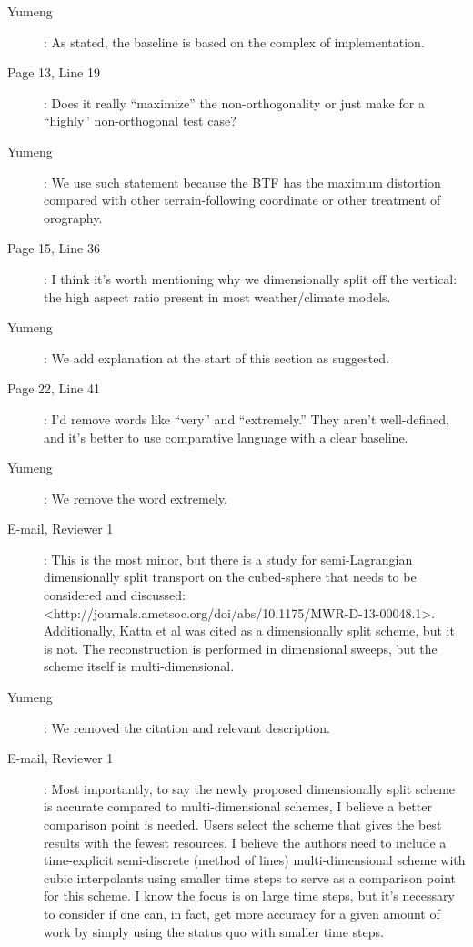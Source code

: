 \documentclass[12pt,a4paper]{article}
\begin{document}
\begin{description}
\item [Yumeng]: As stated, the baseline is based on the complex of implementation. 

\item [Page 13, Line 19]: Does it really ``maximize'' the non-orthogonality or just make for a ``highly'' non-orthogonal test case?

\item [Yumeng]: We use such statement because the BTF has the maximum distortion compared with other terrain-following coordinate or other treatment of orography.

\item [Page 15, Line 36]: I think it's worth mentioning why we dimensionally split off the vertical: the high aspect ratio present in most weather/climate models.

\item [Yumeng]: We add explanation at the start of this section as suggested.

\item [Page 22, Line 41]: I'd remove words like ``very'' and ``extremely.'' They aren't well-defined, and it's better to use comparative language with a clear baseline.

\item [Yumeng]: We remove the word extremely. 

\item [E-mail, Reviewer 1]: This is the most minor, but there is a study for semi-Lagrangian dimensionally split transport on the cubed-sphere that needs to be considered and discussed: <http://journals.ametsoc.org/doi/abs/10.1175/MWR-D-13-00048.1>. Additionally, Katta et al was cited as a dimensionally split scheme, but it is not. The reconstruction is performed in dimensional sweeps, but the scheme itself is multi-dimensional.

\item [Yumeng]: We removed the citation and relevant description. 

\item [E-mail, Reviewer 1]: Most importantly, to say the newly proposed dimensionally split scheme is accurate compared to multi-dimensional schemes, I believe a better comparison point is needed. Users select the scheme that gives the best results with the fewest resources. I believe the authors need to include a time-explicit semi-discrete (method of lines) multi-dimensional scheme with cubic interpolants using smaller time steps to serve as a comparison point for this scheme. I know the focus is on large time steps, but it's necessary to consider if one can, in fact, get more accuracy for a given amount of work by simply using the status quo with smaller time steps. 


\end{description}
\end{document}
